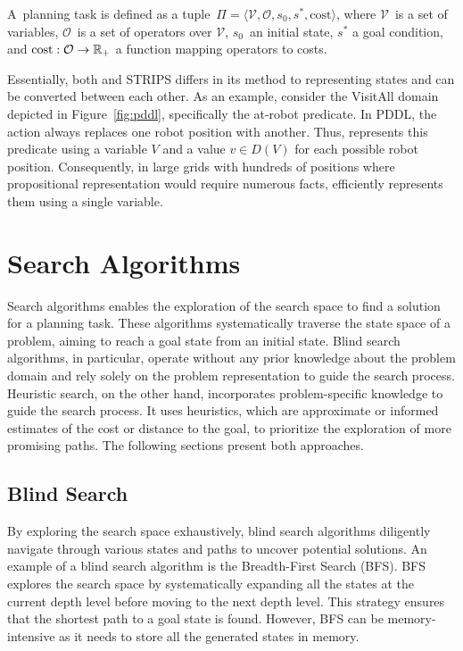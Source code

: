 \begin{definition}\label{def:sasplanningtask}
    A~\sas planning task is defined as a tuple~$\Pi=\langle\mathcal{V},\mathcal{O},s_0,s^*, \text{cost}\rangle$, where $\mathcal{V}$~is a set of variables, $\mathcal{O}$~is a set of operators over $\mathcal{V}$, $s_0$~an initial state, $s^*$ a goal condition, and $\text{cost}:\mathcal{O}\rightarrow\mathbb{R}_{+}$ a function mapping operators to costs.
\end{definition}

Essentially, both \sas and STRIPS differs in its method to representing states and can be converted between each other. As an example, consider the VisitAll domain depicted in Figure~\ref{fig:pddl}, specifically the at-robot predicate. In PDDL, the action always replaces one robot position with another. Thus, \sas represents this predicate using a variable $V$ and a value $v \in D(V)$ for each possible robot position. Consequently, in large grids with hundreds of positions where propositional representation would require numerous facts, \sas efficiently represents them using a single variable.

\section{Search Algorithms}
\label{sec:background_searchalgorithms}

Search algorithms enables the exploration of the search space to find a solution for a planning task. These algorithms systematically traverse the state space of a problem, aiming to reach a goal state from an initial state. Blind search algorithms, in particular, operate without any prior knowledge about the problem domain and rely solely on the problem representation to guide the search process. Heuristic search, on the other hand, incorporates problem-specific knowledge to guide the search process. It uses heuristics, which are approximate or informed estimates of the cost or distance to the goal, to prioritize the exploration of more promising paths. The following sections present both approaches.

\subsection{Blind Search}
\label{sec:background_blindsearch}

By exploring the search space exhaustively, blind search algorithms diligently navigate through various states and paths to uncover potential solutions. An example of a blind search algorithm is the Breadth-First Search (BFS). BFS explores the search space by systematically expanding all the states at the current depth level before moving to the next depth level. This strategy ensures that the shortest path to a goal state is found. However, BFS can be memory-intensive as it needs to store all the generated states in memory.

